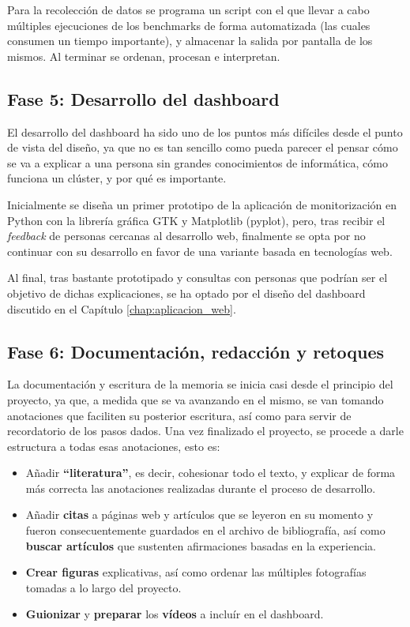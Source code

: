 Para la recolección de datos se programa un script con el que llevar a cabo múltiples ejecuciones de los benchmarks de forma automatizada (las cuales consumen un tiempo importante), y almacenar la salida por pantalla de los mismos. Al terminar se ordenan, procesan e interpretan.

\subsection{Fase 5: Desarrollo del dashboard}
El desarrollo del dashboard ha sido uno de los puntos más difíciles desde el punto de vista del diseño, ya que no es tan sencillo como pueda parecer el pensar cómo se va a explicar a una persona sin grandes conocimientos de informática, cómo funciona un clúster, y por qué es importante.

Inicialmente se diseña un primer prototipo de la aplicación de monitorización en Python con la librería gráfica GTK y Matplotlib (pyplot), pero, tras recibir el \textit{feedback} de personas cercanas al desarrollo web, finalmente se opta por no continuar con su desarrollo en favor de una variante basada en tecnologías web.

Al final, tras bastante prototipado y consultas con personas que podrían ser el objetivo de dichas explicaciones, se ha optado por el diseño del dashboard discutido en el Capítulo \ref{chap:aplicacion_web}.

\subsection{Fase 6: Documentación, redacción y retoques}
La documentación y escritura de la memoria se inicia casi desde el principio del proyecto, ya que, a medida que se va avanzando en el mismo, se van tomando anotaciones que faciliten su posterior escritura, así como para servir de recordatorio de los pasos dados. Una vez finalizado el proyecto, se procede a darle estructura a todas esas anotaciones, esto es:
\begin{itemize}
    \item Añadir \textbf{``literatura''}, es decir, cohesionar todo el texto, y explicar de forma más correcta las anotaciones realizadas durante el proceso de desarrollo.
    \item Añadir \textbf{citas} a páginas web y artículos que se leyeron en su momento y fueron consecuentemente guardados en el archivo de bibliografía, así como \textbf{buscar artículos} que sustenten afirmaciones basadas en la experiencia.
    \item \textbf{Crear figuras} explicativas, así como ordenar las múltiples fotografías tomadas a lo largo del proyecto.
    \item \textbf{Guionizar} y \textbf{preparar} los \textbf{vídeos} a incluír en el dashboard.
\end{itemize}

